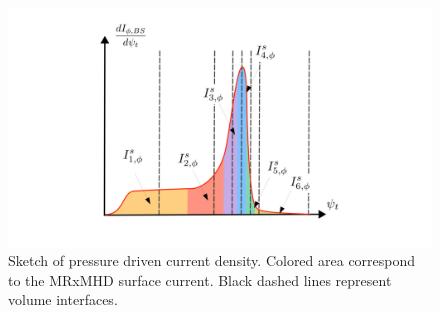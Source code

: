 \documentclass[my_thesis.tex]{subfiles}
\begin{document}
\begin{figure}
    \centering
    \includegraphics[width=\linewidth]{main/Figures_CurrentConstraint/ABaillod_fig4.pdf}
    \caption{Sketch of pressure driven current density. Colored area correspond to the \ac{MRxMHD} surface current. Black dashed lines represent volume interfaces.}
    \label{fig:sketch_bootstrap}
\end{figure}
\end{document}
